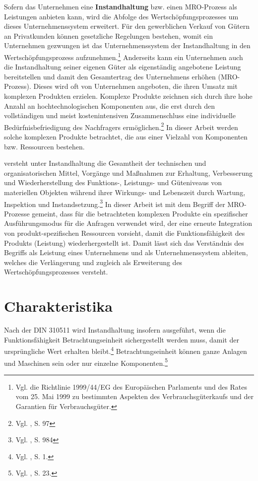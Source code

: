 Sofern das Unternehmen eine \textbf{Instandhaltung} bzw. einen MRO-Prozess als Leistungen anbieten kann, wird die Abfolge des Wertschöpfungsprozesses um dieses Unternehmenssystem erweitert. Für den gewerblichen Verkauf von Gütern an Privatkunden können gesetzliche Regelungen bestehen, womit ein Unternehmen gezwungen ist das Unternehmenssystem der Instandhaltung in den Wertschöpfungsprozess aufzunehmen.\footnote{Vgl. die Richtlinie 1999/44/EG des Europäischen Parlaments und des Rates vom 25. Mai 1999 zu bestimmten Aspekten des Verbrauchsgüterkaufs und der Garantien für Verbrauchsgüter.} Anderseits kann ein Unternehmen auch die Instandhaltung seiner eigenen Güter als eigenständig angebotene Leistung bereitstellen und damit den Gesamtertrag des Unternehmens erhöhen (MRO-Prozess). Dieses wird oft von Unternehmen angeboten, die ihren Umsatz mit komplexen Produkten erzielen. Komplexe Produkte zeichnen sich durch ihre hohe Anzahl an hochtechnologischen Komponenten aus, die erst durch den vollständigen und meist kostenintensiven Zusammenschluss eine individuelle Bedürfnisbefriedigung des Nachfragers ermöglichen.\footnote{Vgl. \cite{komplexe2009Schmidt}, S. 97} In dieser Arbeit werden solche komplexen Produkte betrachtet, die aus einer Vielzahl von Komponenten bzw. Ressourcen bestehen.

\citeauthor{helbing2010instandhaltung} versteht unter Instandhaltung die \glqq Gesamtheit der technischen und organisatorischen Mittel, Vorgänge und Maßnahmen zur Erhaltung, Verbesserung und Wiederherstellung des Funktions-, Leistungs- und Güteniveaus von materiellen Objekten während ihrer Wirkungs- und Lebenszeit durch Wartung, Inspektion und Instandsetzung.\grqq\footnote{Vgl. \citeauthor{helbing2010instandhaltung}, S. 984} In dieser Arbeit ist mit dem Begriff der MRO-Prozesse gemeint, dass für die betrachteten komplexen Produkte ein spezifischer Ausführungsmodus für die Anfragen verwendet wird, der eine erneute Integration von produkt-spezifischen Ressourcen vorsieht, damit die Funktionsfähigkeit des Produkts (Leistung) wiederhergestellt ist. Damit lässt sich das Verständnis des Begriffs als Leistung eines Unternehmens und als Unternehmenssystem ableiten, welches die Verlängerung und zugleich als Erweiterung des Wertschöpfungsprozesses versteht.

\section{Charakteristika}

Nach der DIN 310511 wird Instandhaltung insofern ausgeführt, wenn die Funktionsfähigkeit Betrachtungseinheit sichergestellt werden muss, damit der ursprüngliche Wert erhalten bleibt.\footnote{Vgl. \cite{Strunz:2012aa}, S. 1.} Betrachtungseinheit können ganze Anlagen und Maschinen sein oder nur einzelne Komponenten.\footnote{Vgl. \cite{schenk2010techSys}, S. 23.}

